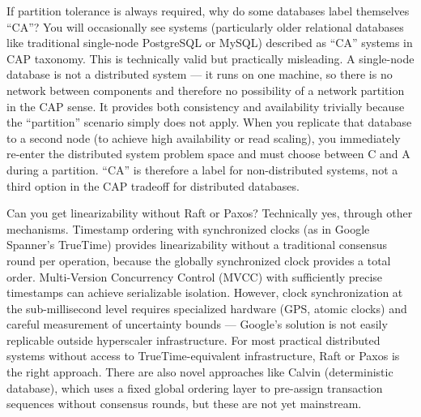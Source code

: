 \documentclass[11pt,a4paper]{article}
\begin{document}
\begin{curiobox}{If partition tolerance is always required, why do some databases label themselves ``CA''?}
You will occasionally see systems (particularly older relational databases like traditional single-node PostgreSQL or MySQL) described as ``CA'' systems in CAP taxonomy. This is technically valid but practically misleading. A single-node database is not a distributed system --- it runs on one machine, so there is no network between components and therefore no possibility of a network partition in the CAP sense. It provides both consistency and availability trivially because the ``partition'' scenario simply does not apply. When you replicate that database to a second node (to achieve high availability or read scaling), you immediately re-enter the distributed system problem space and must choose between C and A during a partition. ``CA'' is therefore a label for non-distributed systems, not a third option in the CAP tradeoff for distributed databases.
\end{curiobox}

\begin{curiobox}{Can you get linearizability without Raft or Paxos?}
Technically yes, through other mechanisms. Timestamp ordering with synchronized clocks (as in Google Spanner's TrueTime) provides linearizability without a traditional consensus round per operation, because the globally synchronized clock provides a total order. Multi-Version Concurrency Control (MVCC) with sufficiently precise timestamps can achieve serializable isolation. However, clock synchronization at the sub-millisecond level requires specialized hardware (GPS, atomic clocks) and careful measurement of uncertainty bounds --- Google's solution is not easily replicable outside hyperscaler infrastructure. For most practical distributed systems without access to TrueTime-equivalent infrastructure, Raft or Paxos is the right approach. There are also novel approaches like Calvin (deterministic database), which uses a fixed global ordering layer to pre-assign transaction sequences without consensus rounds, but these are not yet mainstream.
\end{curiobox}
\end{document}
